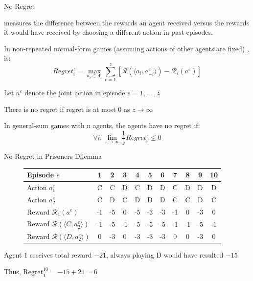 \begin{frame}{No Regret}

 measures the difference between the rewards an agent received versus the rewards it would have received by choosing a different action in past episodes. 
\blist
\item In non-repeated normal-form games (assuming actions of other agents are fixed) , is:
\elist
\vspace{0pt}
\begin{equation*}
    Regret_i^{z} = \max_{a_i \in A_i}\sum_{e = 1}^z\left[\mathcal{R}(\langle a_i, a_{-i}^{e}\rangle) - \mathcal{R}_i (a^e) \right]
\end{equation*}

\blist
    \item Let \(a^e\) denote the joint action in episode \(e = 1, ...., z\)
    \item There is no regret if regret is at most 0 as $z \to \infty$ 
    \item  In general-sum games with n agents, the agents have no regret if:
\elist
\vspace{1pt}
 \[
 \forall i: \lim_{z \to \infty} \frac{1}{z}Regret_{i}^{z} \le 0
 \]

\end{frame}

\begin{frame}{No Regret in Prisoners Dilemma}

\begin{figure}[t]
	\centering
	\begin{tabular}{@{} l c c c c c c c c c c @{}}
		\toprule
		Episode $e$ \hspace{5em} 					  & 1 & 2 & 3 & 4 & 5 & 6 & 7 & 8 & 9 & 10 \\
		\midrule
		Action $a^e_1$  			 						 &  C &  C & D  & C  &  D  & D  &  C & D  & D & D \\
		Action $a^e_2$  			 						&  C &  D & C  & D  &  D  & D  &  C & C  & D & C \\
		Reward $\mathcal{R}_1(a^e)$						 & -1 & -5 & 0  & -5 & -3 & -3 & -1 & 0 & -3 & 0 \\
		\midrule
		Reward $\mathcal{R}(\langle C, a^e_2\rangle)$	& -1 & -5 & -1 & -5 & -5 & -5 & -1 & -1 & -5 & -1 \\
		Reward $\mathcal{R}(\langle D, a^e_2\rangle)$	&  0 & -3 & 0 & -3  & -3 & -3 & 0  & 0 & -3 & 0 \\
		\bottomrule
	\end{tabular}
 \end{figure}

 \blist
    \item Agent 1 receives total reward \(-21\), always playing D would have resulted \(-15\) 
    \item Thus, \(\text{Regret}_{1}^{10} = -15 + 21 = 6\)
 \elist
    
\end{frame}


